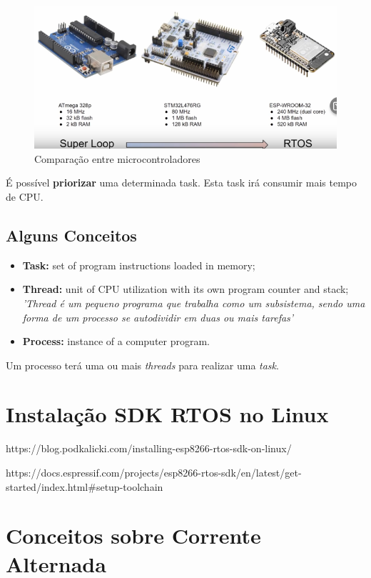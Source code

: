 \documentclass[a4paper, 12pt]{article}
\begin{document}
\newpage
\begin{figure} [h]
	\centering
	\includegraphics[width=0.6\linewidth]{imagens/screenshot003}
	\caption{Comparação entre microcontroladores}
	\label{fig:screenshot003}
\end{figure}

É possível \textbf{priorizar} uma determinada task. Esta task irá consumir mais tempo de CPU.

\subsection{Alguns Conceitos}
	\begin{itemize}
		\item \textbf{Task:} set of program instructions loaded in memory;
		\item \textbf{Thread:} unit of CPU utilization with its own program counter and stack;\\
		\textit{'Thread é um pequeno programa que trabalha como um subsistema, sendo uma forma de um processo se autodividir em duas ou mais tarefas'}
		\item \textbf{Process:} instance of a computer program. 
	\end{itemize}

Um processo terá uma ou mais \textit{threads} para realizar uma \textit{task}.





\section{Instalação SDK RTOS no Linux}
https://blog.podkalicki.com/installing-esp8266-rtos-sdk-on-linux/

https://docs.espressif.com/projects/esp8266-rtos-sdk/en/latest/get-started/index.html\#setup-toolchain


\section{Conceitos sobre Corrente Alternada}
\end{document}
